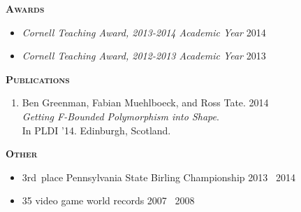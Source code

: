 \documentclass{article}
\newcommand{\mysection}[1]{\vspace{0.5cm}
\hspace{-1.3cm}\textsc{\textbf{#1}}~\hrulefill}
\begin{document}
\mysection{Awards} %
\begin{itemize}[topsep=-0.2cm,itemsep=0.1cm]
\item \emph{Cornell Teaching Award, 2013-2014 Academic Year} \hfill 2014
\item \emph{Cornell Teaching Award, 2012-2013 Academic Year} \hfill 2013
\end{itemize}


\mysection{Publications}

\begin{enumerate}[topsep=-0.2cm,itemsep=0.1cm]
\item 
  Ben Greenman, Fabian Muehlboeck, and Ross Tate. \hfill 2014 \\
  \emph{Getting F-Bounded Polymorphism into Shape}. \\
  In PLDI '14.
  Edinburgh, Scotland.
\end{enumerate}

\mysection{Other}

\begin{itemize}[topsep=-0.2cm,itemsep=0.1cm]
\item 3rd~place Pennsylvania State Birling Championship \hfill 2013 \textendash\ 2014
\item 35 video game world records \hfill 2007 \textendash\ 2008
\end{itemize}
\end{document}
